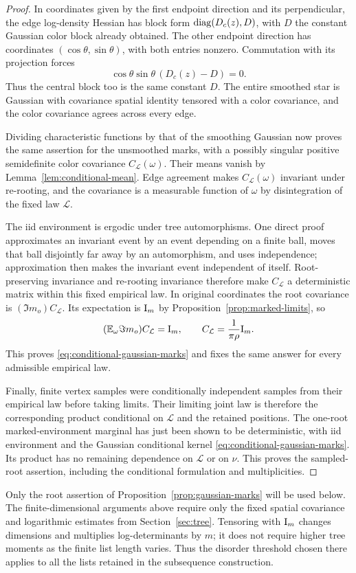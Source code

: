 \begin{proof}
In coordinates given by the first endpoint direction and
its perpendicular, the edge log-density Hessian has block
form \(\operatorname{diag}(D_c(z),D)\), with \(D\) the constant Gaussian
color block already obtained.  The other endpoint direction
has coordinates \((\cos\theta,\sin\theta)\), with both
entries nonzero.  Commutation with its projection forces
\[
 \cos\theta\sin\theta\,(D_c(z)-D)=0.
\]
Thus the central block too is the same constant \(D\).
The entire smoothed star is Gaussian with covariance spatial
identity tensored with a color covariance, and the color
covariance agrees across every edge.

Dividing characteristic functions by that of the smoothing
Gaussian now proves the same assertion for the unsmoothed
marks, with a possibly singular positive semidefinite color
covariance \(C_{\mathcal L}(\omega)\).  Their means vanish by
Lemma~\ref{lem:conditional-mean}.  Edge agreement makes
\(C_{\mathcal L}(\omega)\) invariant under re-rooting, and
the covariance is a measurable function of \(\omega\) by
disintegration of the fixed law \(\mathcal L\).

The iid environment is ergodic under tree automorphisms.  One
direct proof approximates an invariant event by an event
depending on a finite ball, moves that ball disjointly far
away by an automorphism, and uses independence; approximation
then makes the invariant event independent of itself.
Root-preserving invariance and re-rooting invariance therefore
make \(C_{\mathcal L}\) a deterministic matrix within this
fixed empirical law.  In original coordinates the root
covariance is \((\Im m_o)C_{\mathcal L}\).  Its expectation
is \(\mathrm I_m\) by Proposition~\ref{prop:marked-limits}, so
\[
 (\mathbb E_\omega\Im m_o)C_{\mathcal L}=\mathrm I_m,
 \qquad C_{\mathcal L}=\frac1{\pi\rho}\mathrm I_m.
\]
This proves \eqref{eq:conditional-gaussian-marks} and fixes the
same answer for every admissible empirical law.

Finally, finite vertex samples were conditionally independent
samples from their empirical law before taking limits.  Their
limiting joint law is therefore the corresponding product
conditional on \(\mathcal L\) and the retained positions.
The one-root marked-environment marginal has just been shown
to be deterministic, with iid environment and the Gaussian
conditional kernel \eqref{eq:conditional-gaussian-marks}.
Its product has no remaining dependence on \(\mathcal L\)
or on \(\nu\).  This proves the sampled-root assertion,
including the conditional formulation and multiplicities.
\end{proof}

Only the root assertion of Proposition~\ref{prop:gaussian-marks}
will be used below.  The finite-dimensional arguments above
require only the fixed spatial covariance and logarithmic
estimates from Section~\ref{sec:tree}.  Tensoring with
\(\mathrm I_m\) changes dimensions and multiplies log-determinants
by \(m\); it does not require higher tree moments as the
finite list length varies.  Thus the disorder threshold
chosen there applies to all the lists retained in the
subsequence construction.
